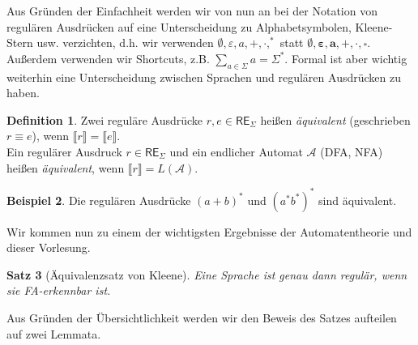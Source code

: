\documentclass[11pt, a4paper]{article}
\theoremstyle{definition}
\newtheorem{definition}{Definition}[section]
\newtheorem{example}[definition]{Beispiel}
\theoremstyle{plain}
\newtheorem{theorem}[definition]{Satz}
\numberwithin{equation}{section}
\begin{document}
Aus Gründen der Einfachheit werden wir von nun an bei der Notation von regulären Ausdrücken auf eine Unterscheidung zu Alphabetsymbolen, Kleene-Stern usw. verzichten, d.h. wir verwenden \( \emptyset, \varepsilon, a, +, \cdot, ^\ast \) statt \( \bm{\emptyset}, \bm{\varepsilon}, \bm{a}, \bm{+}, \bm{\cdot}, \overset{\bm{\ast}}{} \). Außerdem verwenden wir Shortcuts, z.B. \( \sum_{a\in\Sigma} a = \Sigma^\ast \). Formal ist aber wichtig weiterhin eine Unterscheidung zwischen Sprachen und regulären Ausdrücken zu haben.
\begin{definition}
	Zwei reguläre Ausdrücke \( r, e \in \mathsf{RE}_\Sigma \) heißen \textit{äquivalent} (geschrieben \( r \equiv e \)), wenn \( \llbracket r \rrbracket = \llbracket e \rrbracket \).\\
	Ein regulärer Ausdruck \( r \in \mathsf{RE}_\Sigma \) und ein endlicher Automat \( \mathcal{A} \) (DFA, NFA) heißen \textit{äquivalent}, wenn  \( \llbracket r \rrbracket = L(\mathcal{A}) \).
\end{definition}
\begin{example}
	Die regulären Ausdrücke \( (a + b)^\ast \) und \( (a^\ast b^\ast)^\ast \) sind äquivalent.
\end{example}
Wir kommen nun zu einem der wichtigsten Ergebnisse der Automatentheorie und dieser Vorlesung.
\begin{theorem}[Äquivalenzsatz von Kleene]\label{thm:kleene_equivalence}
	Eine Sprache ist genau dann regulär, wenn sie FA-erkennbar ist.
\end{theorem}
Aus Gründen der Übersichtlichkeit werden wir den Beweis des Satzes aufteilen auf zwei Lemmata.
\end{document}
